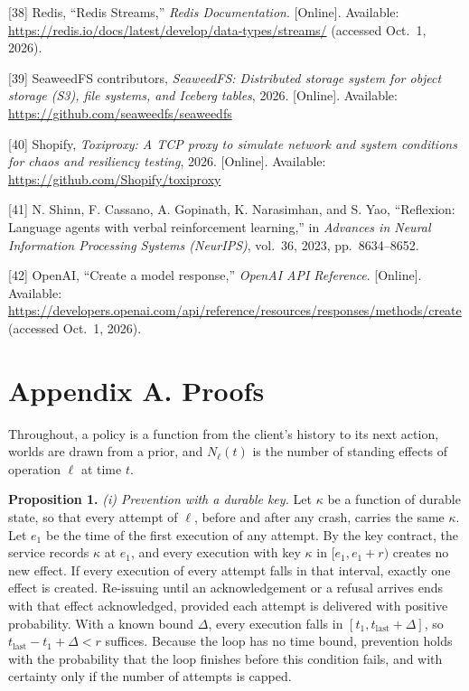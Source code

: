 \documentclass[
  10pt,
]{article}
\begin{document}
{[}38{]} Redis, ``Redis Streams,'' \emph{Redis Documentation}.
{[}Online{]}. Available: \url{https://redis.io/docs/latest/develop/data-types/streams/} (accessed
Oct.~1, 2026).

{[}39{]} SeaweedFS contributors, \emph{SeaweedFS: Distributed storage
system for object storage (S3), file systems, and Iceberg tables}, 2026.
{[}Online{]}. Available: \url{https://github.com/seaweedfs/seaweedfs}

{[}40{]} Shopify, \emph{Toxiproxy: A TCP proxy to simulate network and
system conditions for chaos and resiliency testing}, 2026. {[}Online{]}.
Available: \url{https://github.com/Shopify/toxiproxy}

{[}41{]} N. Shinn, F. Cassano, A. Gopinath, K. Narasimhan, and S. Yao,
``Reflexion: Language agents with verbal reinforcement learning,'' in
\emph{Advances in Neural Information Processing Systems (NeurIPS)},
vol.~36, 2023, pp.~8634--8652.

{[}42{]} OpenAI, ``Create a model response,'' \emph{OpenAI API
Reference}. {[}Online{]}. Available: \url{https://developers.openai.com/api/reference/resources/responses/methods/create}
(accessed Oct.~1, 2026).

\endgroup

\hypertarget{appendix-a.-proofs}{%
\section*{Appendix A. Proofs}\label{appendix-a.-proofs}}

Throughout, a policy is a function from the client's history to its next
action, worlds are drawn from a prior, and \(N_\ell(t)\) is the number
of standing effects of operation \(\ell\) at time \(t\).

\textbf{Proposition 1.} \emph{(i) Prevention with a durable key.} Let
\(\kappa\) be a function of durable state, so that every attempt of
\(\ell\), before and after any crash, carries the same \(\kappa\). Let
\(e_1\) be the time of the first execution of any attempt. By the key
contract, the service records \(\kappa\) at \(e_1\), and every execution
with key \(\kappa\) in \([e_1, e_1 + r)\) creates no new effect. If
every execution of every attempt falls in that interval, exactly one
effect is created. Re-issuing until an acknowledgement or a refusal
arrives ends with that effect acknowledged, provided each attempt is
delivered with positive probability. With a known bound \(\Delta\),
every execution falls in \([t_1, t_{\text{last}} + \Delta]\), so
\(t_{\text{last}} - t_1 + \Delta < r\) suffices. Because the loop has no
time bound, prevention holds with the probability that the loop finishes
before this condition fails, and with certainty only if the number of
attempts is capped.
\end{document}
